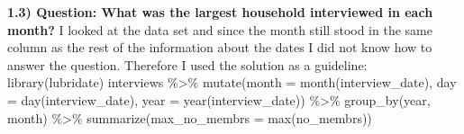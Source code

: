 \documentclass{article}
\begin{document}
\textbf{1.3) Question: What was the largest household interviewed in each month?}\newline
I looked at the data set and since the month still stood in the same column as the rest of the information about the dates I did not know how to answer the question. Therefore I used the solution as a guideline:\newline
library(lubridate)\newline
interviews $\%$\textgreater$\%$\newline
  mutate(month = month(interview\_date),\newline
         day = day(interview\_date),\newline
         year = year(interview\_date)) $\%$\textgreater$\%$\newline
  group\_by(year, month) $\%$\textgreater$\%$\newline
  summarize(max\_no\_membrs = max(no\_membrs))\newline
\end{document}

